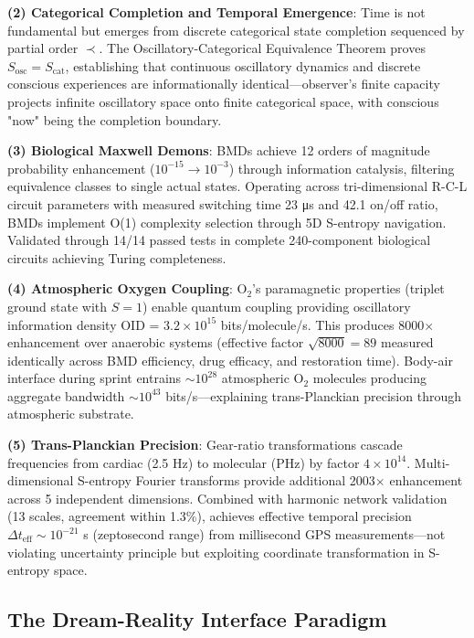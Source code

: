 \documentclass[11pt,onecolumn]{article}
\begin{document}
\textbf{(2) Categorical Completion and Temporal Emergence}: Time is not fundamental but emerges from discrete categorical state completion sequenced by partial order $\prec$. The Oscillatory-Categorical Equivalence Theorem proves $S_{\text{osc}} = S_{\text{cat}}$, establishing that continuous oscillatory dynamics and discrete conscious experiences are informationally identical---observer's finite capacity projects infinite oscillatory space onto finite categorical space, with conscious "now" being the completion boundary.

\textbf{(3) Biological Maxwell Demons}: BMDs achieve 12 orders of magnitude probability enhancement ($10^{-15} \to 10^{-3}$) through information catalysis, filtering equivalence classes to single actual states. Operating across tri-dimensional R-C-L circuit parameters with measured switching time 23 μs and 42.1 on/off ratio, BMDs implement O(1) complexity selection through 5D S-entropy navigation. Validated through 14/14 passed tests in complete 240-component biological circuits achieving Turing completeness.

\textbf{(4) Atmospheric Oxygen Coupling}: O$_2$'s paramagnetic properties (triplet ground state with $S=1$) enable quantum coupling providing oscillatory information density OID = $3.2 \times 10^{15}$ bits/molecule/s. This produces 8000$\times$ enhancement over anaerobic systems (effective factor $\sqrt{8000} = 89$ measured identically across BMD efficiency, drug efficacy, and restoration time). Body-air interface during sprint entrains $\sim 10^{28}$ atmospheric O$_2$ molecules producing aggregate bandwidth $\sim 10^{43}$ bits/s---explaining trans-Planckian precision through atmospheric substrate.

\textbf{(5) Trans-Planckian Precision}: Gear-ratio transformations cascade frequencies from cardiac (2.5 Hz) to molecular (PHz) by factor $4 \times 10^{14}$. Multi-dimensional S-entropy Fourier transforms provide additional 2003$\times$ enhancement across 5 independent dimensions. Combined with harmonic network validation (13 scales, agreement within 1.3\%), achieves effective temporal precision $\Delta t_{\text{eff}} \sim 10^{-21}$ s (zeptosecond range) from millisecond GPS measurements---not violating uncertainty principle but exploiting coordinate transformation in S-entropy space.

\subsection{The Dream-Reality Interface Paradigm}
\end{document}
